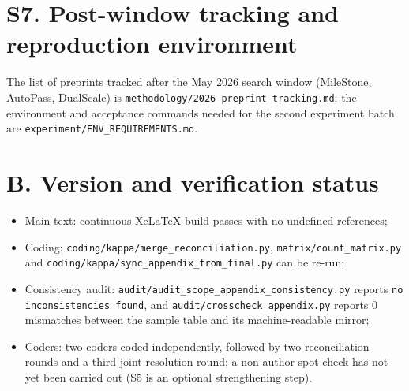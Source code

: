 \documentclass[11pt,a4paper]{article}
\begin{document}
\section{S7. Post-window tracking and reproduction environment}
The list of preprints tracked after the May 2026 search window (MileStone, AutoPass, DualScale) is \texttt{methodology/2026-preprint-tracking.md}; the environment and acceptance commands needed for the second experiment batch are \texttt{experiment/ENV\_REQUIREMENTS.md}.

\section*{B. Version and verification status}
\begin{itemize}[leftmargin=2em,itemsep=1pt]
  \item Main text: continuous XeLaTeX build passes with no undefined references;
  \item Coding: \texttt{coding/kappa/merge\_reconciliation.py},
    \texttt{matrix/count\_matrix.py} and
    \texttt{coding/kappa/sync\_appendix\_from\_final.py} can be re-run;
  \item Consistency audit: \texttt{audit/audit\_scope\_appendix\_consistency.py}
    reports \texttt{no inconsistencies found}, and
    \texttt{audit/crosscheck\_appendix.py} reports 0 mismatches between the
    sample table and its machine-readable mirror;
  \item Coders: two coders coded independently, followed by two reconciliation
    rounds and a third joint resolution round; a non-author spot check has not
    yet been carried out (S5 is an optional strengthening step).
\end{itemize}
\end{document}
